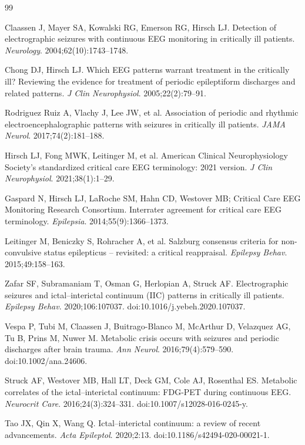 \documentclass{iopjournal}
\begin{document}
\begin{thebibliography}{99}

Claassen J, Mayer SA, Kowalski RG, Emerson RG, Hirsch LJ.
Detection of electrographic seizures with continuous EEG monitoring in critically ill patients.
\textit{Neurology}. 2004;62(10):1743--1748.

Chong DJ, Hirsch LJ.
Which EEG patterns warrant treatment in the critically ill? Reviewing the evidence for treatment of periodic epileptiform discharges and related patterns.
\textit{J Clin Neurophysiol}. 2005;22(2):79--91.

Rodriguez Ruiz A, Vlachy J, Lee JW, et al.
Association of periodic and rhythmic electroencephalographic patterns with seizures in critically ill patients.
\textit{JAMA Neurol}. 2017;74(2):181--188.

Hirsch LJ, Fong MWK, Leitinger M, et al.
American Clinical Neurophysiology Society's standardized critical care EEG terminology: 2021 version.
\textit{J Clin Neurophysiol}. 2021;38(1):1--29.

Gaspard N, Hirsch LJ, LaRoche SM, Hahn CD, Westover MB; Critical Care EEG Monitoring Research Consortium.
Interrater agreement for critical care EEG terminology.
\textit{Epilepsia}. 2014;55(9):1366--1373.

Leitinger M, Beniczky S, Rohracher A, et al.
Salzburg consensus criteria for non-convulsive status epilepticus -- revisited: a critical reappraisal.
\textit{Epilepsy Behav}. 2015;49:158--163.

Zafar SF, Subramaniam T, Osman G, Herlopian A, Struck AF.
Electrographic seizures and ictal--interictal continuum (IIC) patterns in critically ill patients.
\textit{Epilepsy Behav}. 2020;106:107037. doi:10.1016/j.yebeh.2020.107037.

Vespa P, Tubi M, Claassen J, Buitrago-Blanco M, McArthur D, Velazquez AG, Tu B, Prins M, Nuwer M.
Metabolic crisis occurs with seizures and periodic discharges after brain trauma.
\textit{Ann Neurol}. 2016;79(4):579--590. doi:10.1002/ana.24606.

Struck AF, Westover MB, Hall LT, Deck GM, Cole AJ, Rosenthal ES.
Metabolic correlates of the ictal--interictal continuum: FDG-PET during continuous EEG.
\textit{Neurocrit Care}. 2016;24(3):324--331. doi:10.1007/s12028-016-0245-y.

Tao JX, Qin X, Wang Q.
Ictal--interictal continuum: a review of recent advancements.
\textit{Acta Epileptol}. 2020;2:13. doi:10.1186/s42494-020-00021-1.


\end{thebibliography}
\end{document}
